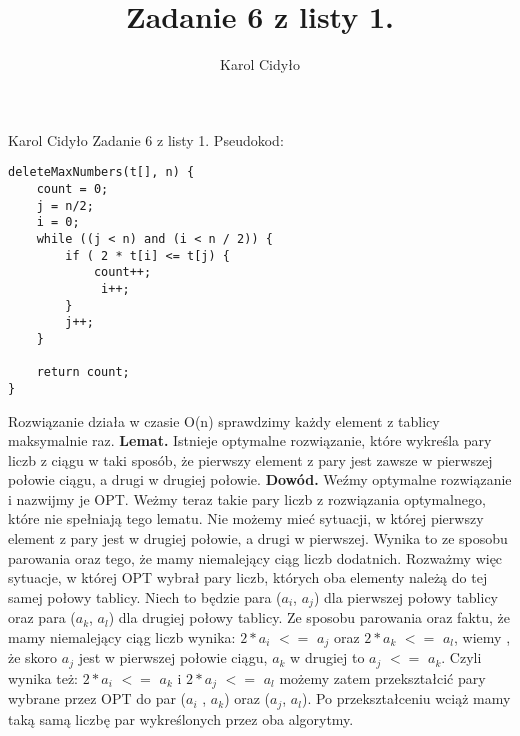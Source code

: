 \documentclass[a4paper,10pt]{article}
\author{Karol Cidyło}
\title {Zadanie 6 z listy 1.}
\begin{document}
Karol Cidyło \newline \newline \newline
Zadanie 6 z listy 1. \newline \newline
Pseudokod:  \newline
\begin{lstlisting}
deleteMaxNumbers(t[], n) {
    count = 0;
    j = n/2;
    i = 0;
    while ((j < n) and (i < n / 2)) {
        if ( 2 * t[i] <= t[j) {
            count++;
             i++;
        }
        j++;
    }

    return count;
}
\end{lstlisting}
Rozwiązanie działa w czasie O(n) sprawdzimy każdy element z tablicy maksymalnie raz. \newline \newline
\textbf{Lemat.} \newline 
Istnieje optymalne rozwiązanie, które wykreśla pary liczb z ciągu w taki sposób, że pierwszy element z pary jest zawsze w pierwszej połowie ciągu, a drugi w drugiej połowie. \newline
\textbf{Dowód.} \newline 
Weźmy optymalne rozwiązanie i nazwijmy je OPT. \newline
Weżmy teraz takie pary liczb z rozwiązania optymalnego, które nie spełniają tego lematu. \newline
Nie możemy mieć sytuacji, w której pierwszy element z pary jest w drugiej połowie, a drugi w pierwszej. Wynika to ze sposobu parowania oraz tego, że mamy niemalejący ciąg liczb dodatnich.\newline
Rozważmy więc sytuacje, w której OPT wybrał pary liczb, których oba elementy należą do tej samej połowy tablicy. \newline
Niech to będzie para ($a_i$, $a_j$) dla pierwszej połowy tablicy oraz para ($a_k$, $a_l$) dla drugiej połowy tablicy. \newline Ze sposobu parowania oraz faktu, że mamy niemalejący ciąg liczb wynika:  \newline $2*a_i$  $<=$ $a_j$  oraz  $2*a_k$  $<=$ $a_l$, wiemy , że skoro $a_j$ jest w pierwszej połowie ciągu, $a_k$ w drugiej to $a_j$ $<=$ $a_k$. Czyli wynika też: $2*a_i$  $<=$ $a_k$ i $2*a_j$  $<=$ $a_l$ możemy zatem przekształcić pary wybrane przez OPT do par ($a_i$ , $a_k$) oraz ($a_j$, $a_l$). Po przekształceniu wciąż mamy taką samą liczbę par wykreślonych przez oba algorytmy. \newline
\end{document}
